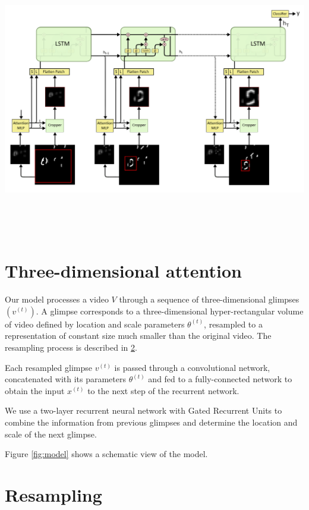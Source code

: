 \documentclass{article} %
\begin{document}
\includegraphics[width=17cm, height=12cm]{LSTM_2D_Attention_v2.png}
\section{Three-dimensional attention}

Our model processes a video $V$ through a sequence of three-dimensional glimpses $\left(v^{(t)}\right)$.
A glimpse corresponds to a three-dimensional hyper-rectangular volume of video defined by location and scale parameters $\theta^{(t)}$, resampled to a representation of constant size much smaller than the original video.
The resampling process is described in \ref{sec:resampling}.

Each resampled glimpse $v^{(t)}$ is passed through a convolutional network, concatenated with its parameters $\theta^{(t)}$ and fed to a fully-connected network to obtain the input $x^{(t)}$ to the next step of the recurrent network.

We use a two-layer recurrent neural network with Gated Recurrent Units\cite{Cho2014} to combine the information from previous glimpses and determine the location and scale of the next glimpse.

Figure \ref{fig:model} shows a schematic view of the model.



\section{Resampling}
\label{sec:resampling}
\end{document}
